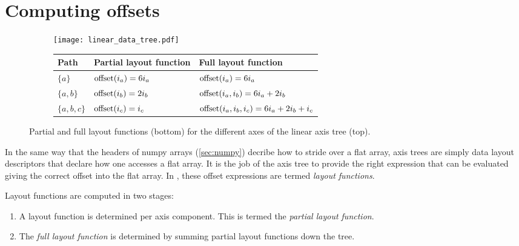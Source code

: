 \documentclass[thesis]{subfiles}
\begin{document}
\section{Computing offsets}
\label{sec:axis_tree_layouts}


\begin{figure}
  \centering

  \begin{subfigure}{.5\textwidth}
    \centering
    \texttt{[image: linear\_data\_tree.pdf]}
  \end{subfigure}

  \vspace{1em}

  \begin{subfigure}{\textwidth}
    \centering
    \begin{tabular}{|l|l|l|}
      \hline
      \textbf{Path} & \textbf{Partial layout function} & \textbf{Full layout function} \\
      \hline
      $\{a\}$ & $\textnormal{offset}(i_a) = 6 i_a$ & $\textnormal{offset}(i_a) = 6 i_a$ \\
      $\{a, b\}$ & $\textnormal{offset}(i_b) = 2 i_b$ & $\textnormal{offset}(i_a, i_b) = 6 i_a + 2 i_b$ \\
      $\{a, b, c\}$ & $\textnormal{offset}(i_c) = i_c$ & $\textnormal{offset}(i_a, i_b, i_c) = 6 i_a + 2 i_b + i_c$ \\
      \hline
    \end{tabular}
  \end{subfigure}
  \caption{
    Partial and full layout functions (bottom) for the different axes of the linear axis tree (top).
  }
  \label{fig:linear_axis_data_tree}
\end{figure}

In the same way that the headers of numpy arrays (\cref{sec:numpy}) decribe how to stride over a flat array, axis trees are simply data layout descriptors that declare how one accesses a flat array.
It is the job of the axis tree to provide the right expression that can be evaluated giving the correct offset into the flat array.
In , these offset expressions are termed \textit{layout functions}.

Layout functions are computed in two stages:

\begin{enumerate}
  \item
    A layout function is determined per axis component.
    This is termed the \textit{partial layout function}.

  \item
    The \textit{full layout function} is determined by summing partial layout functions down the tree.
\end{enumerate}
\end{document}
